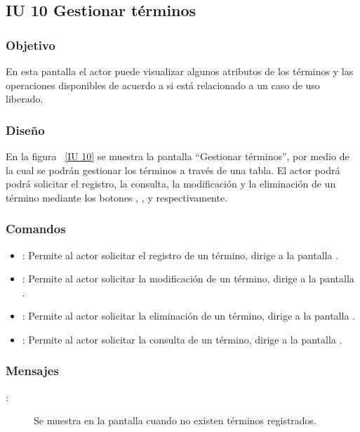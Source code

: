 \newpage 
\subsection{IU 10 Gestionar términos}
\subsubsection{Objetivo}
	
	En esta pantalla el actor puede visualizar algunos atributos de los términos y las operaciones disponibles de acuerdo a si está relacionado a un caso de uso liberado.

\subsubsection{Diseño}

    En la figura ~\ref{IU 10} se muestra la pantalla ``Gestionar términos'', por medio de la cual 
    se podrán gestionar los términos a través de una tabla.
    El actor podrá podrá solicitar el registro, la consulta, la modificación y la eliminación de un término mediante los botones
    , \btnConsulta, \btnEditar y \btnEliminar respectivamente. \\



\subsubsection{Comandos}
\begin{itemize}
	\item {}: Permite al actor solicitar el registro de un término, dirige a la pantalla .
	\item \btnEditar[Modificar]: Permite al actor solicitar la modificación de un término, dirige a la pantalla .
	\item \btnEliminar[Eliminar]: Permite al actor solicitar la eliminación de un término, dirige a la pantalla .
	\item \btnConsulta[Consultar]: Permite al actor solicitar la consulta de un término, dirige a la pantalla .
\end{itemize}

\subsubsection{Mensajes}

	
\begin{description}
	\item[:] Se muestra en la pantalla  cuando no existen términos registrados.
\end{description}
